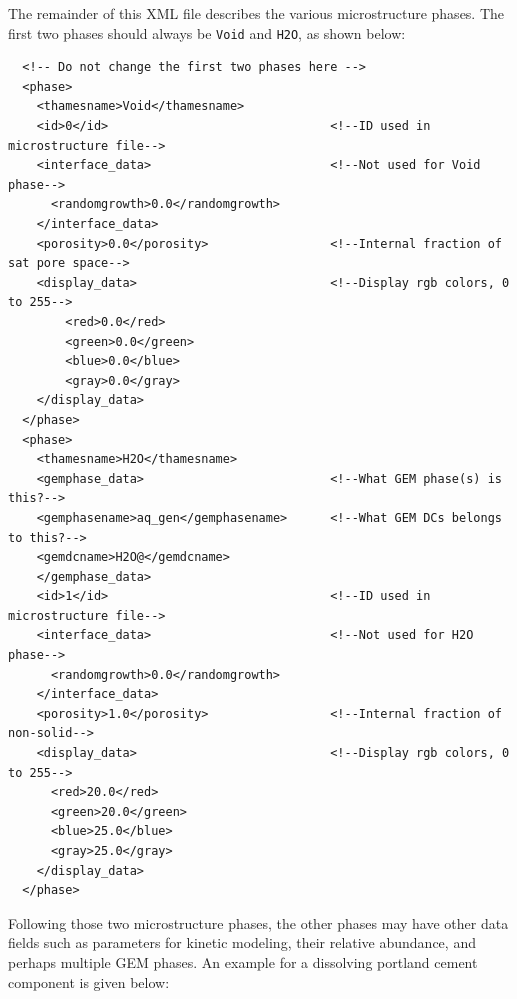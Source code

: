 \documentclass{article}
\begin{document}
The remainder of this XML file describes the various
microstructure phases.  The first two phases should always be \verb!Void! and
\verb!H2O!, as shown below:

\scriptsize{
    \begin{lstlisting}
  <!-- Do not change the first two phases here -->
  <phase>
    <thamesname>Void</thamesname>
    <id>0</id>                               <!--ID used in microstructure file-->
    <interface_data>                         <!--Not used for Void phase-->
      <randomgrowth>0.0</randomgrowth>       
    </interface_data>
    <porosity>0.0</porosity>                 <!--Internal fraction of sat pore space-->
    <display_data>                           <!--Display rgb colors, 0 to 255-->
        <red>0.0</red>
        <green>0.0</green>
        <blue>0.0</blue>
        <gray>0.0</gray>
    </display_data>
  </phase>
  <phase>
    <thamesname>H2O</thamesname>             
    <gemphase_data>                          <!--What GEM phase(s) is this?-->
    <gemphasename>aq_gen</gemphasename>      <!--What GEM DCs belongs to this?-->
    <gemdcname>H2O@</gemdcname>
    </gemphase_data>
    <id>1</id>                               <!--ID used in microstructure file-->
    <interface_data>                         <!--Not used for H2O phase-->
      <randomgrowth>0.0</randomgrowth>
    </interface_data>
    <porosity>1.0</porosity>                 <!--Internal fraction of non-solid-->
    <display_data>                           <!--Display rgb colors, 0 to 255-->
      <red>20.0</red>
      <green>20.0</green>
      <blue>25.0</blue>
      <gray>25.0</gray>
    </display_data>
  </phase>
    \end{lstlisting}
}

\normalsize{ }
Following those two microstructure phases, the other phases may have other data fields
such as parameters for kinetic modeling, their relative abundance, and perhaps
multiple GEM phases.  An example for a dissolving portland cement component is
given below:
\end{document}

